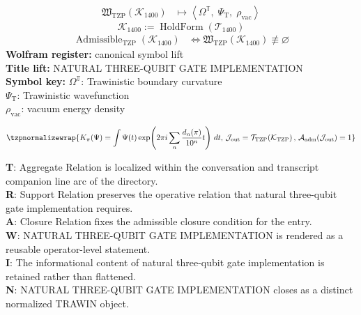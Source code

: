 \noindent
\begin{minipage}[t]{0.48\linewidth}
\begingroup
\small
\[
\begin{aligned}
\mathfrak{W}_{\mathrm{TZP}}\!\left(\mathcal{K}_{1400}\right)
&\longmapsto
\left\langle \Omega^{\mathbb{T}},\; \Psi_{\mathrm{T}},\; \rho_{\mathrm{vac}} \right\rangle
\end{aligned}
\]
\[
\mathcal{K}_{1400}
:=
\operatorname{HoldForm}\!\left(\mathcal{T}_{1400}\right)
\]
\[
\begin{aligned}
\operatorname{Admissible}_{\mathrm{TZP}}\!\left(\mathcal{K}_{1400}\right)
&\Longleftrightarrow
\mathfrak{W}_{\mathrm{TZP}}\!\left(\mathcal{K}_{1400}\right)\not\equiv\varnothing
\end{aligned}
\]
\textbf{Wolfram register:} canonical symbol lift\\
\textbf{Title lift:} NATURAL THREE-QUBIT GATE IMPLEMENTATION\\
\textbf{Symbol key:} \(\Omega^{\mathbb{T}}\): Trawinistic boundary curvature\\ \(\Psi_{\mathrm{T}}\): Trawinistic wavefunction\\ \(\rho_{\mathrm{vac}}\): vacuum energy density
\par
\endgroup
\end{minipage}\hfill
\begin{minipage}[t]{0.48\linewidth}
\[
\tzpnormalizewrap{K_\pi(\Psi)=\int \Psi(t)\exp\!\left(2\pi i\sum_n\frac{d_n(\pi)}{10^n}t\right)\,dt,\,\mathcal{J}_{\mathrm{out}}=\mathcal{T}_{\mathrm{TZP}}\!\left(\mathcal{K}_{\mathrm{TZP}}\right),\,\mathcal{A}_{\mathrm{adm}}\!\left(\mathcal{J}_{\mathrm{out}}\right)=1}
\]

\small
\textbf{T}: Aggregate Relation is localized within the conversation and transcript companion line arc of the directory.\\
\textbf{R}: Support Relation preserves the operative relation that natural three-qubit gate implementation requires.\\
\textbf{A}: Closure Relation fixes the admissible closure condition for the entry.\\
\textbf{W}: NATURAL THREE-QUBIT GATE IMPLEMENTATION is rendered as a reusable operator-level statement.\\
\textbf{I}: The informational content of natural three-qubit gate implementation is retained rather than flattened.\\
\textbf{N}: NATURAL THREE-QUBIT GATE IMPLEMENTATION closes as a distinct normalized TRAWIN object.
\normalsize
\end{minipage}

